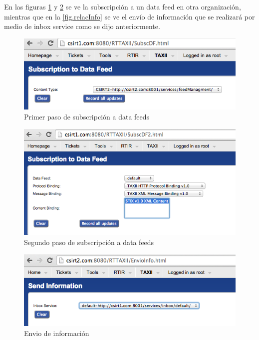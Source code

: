 En las figuras \ref{fig.subfeed} y \ref{fig.subdf} se ve la subscripción a un data feed en otra organización, mientras que en la \ref{fig.relacInfo} se ve el envío de información que se realizará por medio de inbox service como se dijo anteriormente.

\begin{figure}[H]
	\centering
	\includegraphics[scale=0.4]{caso-de-estudio/subscriptionfeed.png}
	\caption{Primer paso de subscripción a data feeds}
	\label{fig.subfeed}
\end{figure}

\begin{figure}[H]
	\centering
	\includegraphics[scale=0.4]{caso-de-estudio/subscriptiondf.png}
	\caption{Segundo paso de subscripción a data feeds}
	\label{fig.subdf}
\end{figure}

\begin{figure}[H]
	\centering
	\includegraphics[scale=0.4]{caso-de-estudio/envioInfo.png}
	\caption{Envio de información}
	\label{fig.envioInfo}
\end{figure}

